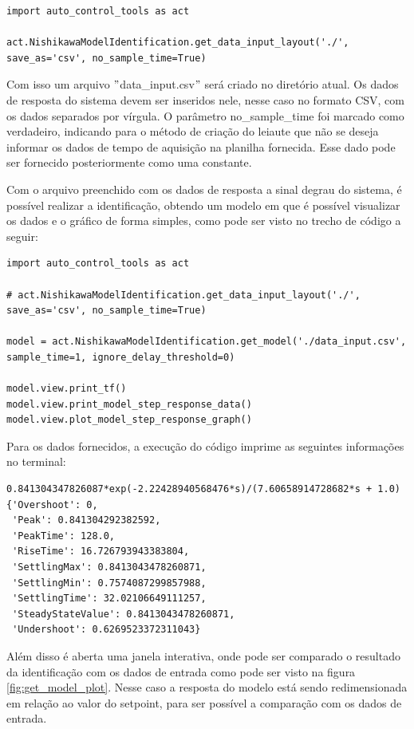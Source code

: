\begin{lstlisting}[label={lst:get_dil}]
import auto_control_tools as act

act.NishikawaModelIdentification.get_data_input_layout('./', save_as='csv', no_sample_time=True)
\end{lstlisting}

Com isso um arquivo \("\)data\_input.csv\("\) será criado no diretório atual.
Os dados de resposta do sistema devem ser inseridos nele, nesse caso no formato CSV, com os dados separados por vírgula.
O parâmetro no\_sample\_time foi marcado como verdadeiro, indicando para o método de criação do leiaute que não
se deseja informar os dados de tempo de aquisição na planilha fornecida.
Esse dado pode ser fornecido posteriormente como uma constante.

Com o arquivo preenchido com os dados de resposta a sinal degrau do sistema, é possível realizar a identificação,
obtendo um modelo em que é possível visualizar os dados e o gráfico de forma simples, como pode ser visto no trecho
de código a seguir:

\begin{lstlisting}[label={lst:get_model}]
import auto_control_tools as act

# act.NishikawaModelIdentification.get_data_input_layout('./', save_as='csv', no_sample_time=True)

model = act.NishikawaModelIdentification.get_model('./data_input.csv', sample_time=1, ignore_delay_threshold=0)

model.view.print_tf()
model.view.print_model_step_response_data()
model.view.plot_model_step_response_graph()
\end{lstlisting}

Para os dados fornecidos, a execução do código imprime as seguintes informações no terminal:
\begin{lstlisting}[label={lst:get_model_out}]
0.841304347826087*exp(-2.22428940568476*s)/(7.60658914728682*s + 1.0)
{'Overshoot': 0,
 'Peak': 0.841304292382592,
 'PeakTime': 128.0,
 'RiseTime': 16.726793943383804,
 'SettlingMax': 0.8413043478260871,
 'SettlingMin': 0.7574087299857988,
 'SettlingTime': 32.02106649111257,
 'SteadyStateValue': 0.8413043478260871,
 'Undershoot': 0.6269523372311043}
\end{lstlisting}

Além disso é aberta uma janela interativa, onde pode ser comparado o resultado da identificação com os dados de entrada
como pode ser visto na figura \ref{fig:get_model_plot}.
Nesse caso a resposta do modelo está sendo redimensionada em relação ao valor do setpoint, para ser possível a
comparação com os dados de entrada.

